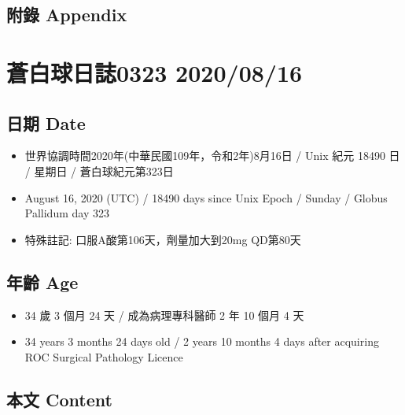 \documentclass[
]{article}
\providecommand{\tightlist}{%
  \setlength{\itemsep}{0pt}\setlength{\parskip}{0pt}}
\begin{document}
\hypertarget{ux9644ux9304-appendix-14}{%
\subsection{附錄 Appendix}\label{ux9644ux9304-appendix-14}}

\hypertarget{ux84bcux767dux7403ux65e5ux8a8c0323-20200816}{%
\section{蒼白球日誌0323
2020/08/16}\label{ux84bcux767dux7403ux65e5ux8a8c0323-20200816}}

\hypertarget{ux65e5ux671f-date-15}{%
\subsection{日期 Date}\label{ux65e5ux671f-date-15}}

\begin{itemize}
\tightlist
\item
  世界協調時間2020年(中華民國109年，令和2年)8月16日 / Unix 紀元 18490 日
  / 星期日 / 蒼白球紀元第323日
\item
  August 16, 2020 (UTC) / 18490 days since Unix Epoch / Sunday / Globus
  Pallidum day 323
\item
  特殊註記: 口服A酸第106天，劑量加大到20mg QD第80天
\end{itemize}

\hypertarget{ux5e74ux9f61-age-15}{%
\subsection{年齡 Age}\label{ux5e74ux9f61-age-15}}

\begin{itemize}
\tightlist
\item
  34 歲 3 個月 24 天 / 成為病理專科醫師 2 年 10 個月 4 天
\item
  34 years 3 months 24 days old / 2 years 10 months 4 days after
  acquiring ROC Surgical Pathology Licence
\end{itemize}

\hypertarget{ux672cux6587-content-15}{%
\subsection{本文 Content}\label{ux672cux6587-content-15}}
\end{document}
